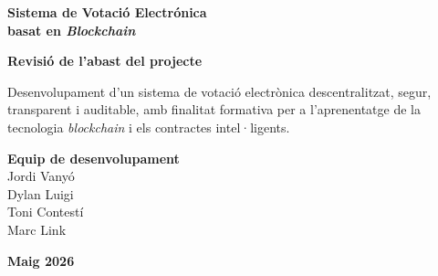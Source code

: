 \documentclass[12pt,a4paper]{article}
\begin{document}
\begin{titlepage}
    \centering

    {\huge\textbf{Sistema de Votació Electrónica \\ basat en \textit{Blockchain}}\par}
    

    \vspace{2.5cm} %

    \begin{center}
        \textbf{\large Revisió de l'abast del projecte}\\[0.5cm]
        \parbox{0.85\textwidth}{
            \centering
            
            Desenvolupament d'un sistema de votació electrònica descentralitzat,
            segur, transparent i auditable, amb finalitat formativa per a l'aprenentatge
            de la tecnologia \textit{blockchain} i els contractes intel·ligents.
        }
    \end{center}

    \vspace{3cm} %

    \textbf{\large Equip de desenvolupament}\\[0.8cm]
    {\large
        Jordi Vanyó \\
        Dylan Luigi \\
        Toni Contestí \\
        Marc Link
    }
    
    \vfill %

    {\large \textbf{Maig 2026}}
    \vspace*{1cm} %

\end{titlepage}
\end{document}

